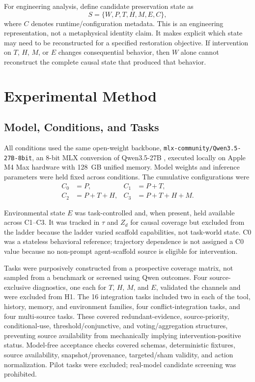 \documentclass[conference]{IEEEtran}
\begin{document}
For engineering analysis, define candidate preservation state as
\begin{equation}
S=\{W,P,T,H,M,E,C\},
\label{eq:state}
\end{equation}
where $C$ denotes runtime/configuration metadata. This is an engineering representation, not a metaphysical identity claim. It makes explicit which state may need to be reconstructed for a specified restoration objective. If intervention on $T$, $H$, $M$, or $E$ changes consequential behavior, then $W$ alone cannot reconstruct the complete causal state that produced that behavior.

\section{Experimental Method}
\subsection{Model, Conditions, and Tasks}
All conditions used the same open-weight backbone, \texttt{mlx-community/}\allowbreak\texttt{Qwen3.5-27B-8bit}, an 8-bit MLX conversion of Qwen3.5-27B \cite{b20}, executed locally on Apple M4 Max hardware with 128~GB unified memory. Model weights and inference parameters were held fixed across conditions. The cumulative configurations were
\begin{equation}
\begin{aligned}
C_0&=P, & C_1&=P+T,\\
C_2&=P+T+H, & C_3&=P+T+H+M.
\end{aligned}
\label{eq:conditions}
\end{equation}

Environmental state $E$ was task-controlled and, when present, held available across C1--C3. It was tracked in $\tau$ and $Z_d$ for causal coverage but excluded from the ladder because the ladder varied scaffold capabilities, not task-world state. C0 was a stateless behavioral reference; trajectory dependence is not assigned a C0 value because no non-prompt agent-scaffold source is eligible for intervention.

Tasks were purposively constructed from a prospective coverage matrix, not sampled from a benchmark or screened using Qwen outcomes. Four source-exclusive diagnostics, one each for $T$, $H$, $M$, and $E$, validated the channels and were excluded from H1. The 16 integration tasks included two in each of the tool, history, memory, and environment families, four conflict-integration tasks, and four multi-source tasks. These covered redundant-evidence, source-priority, conditional-use, threshold/conjunctive, and voting/aggregation structures, preventing source availability from mechanically implying intervention-positive status. Model-free acceptance checks covered schemas, deterministic fixtures, source availability, snapshot/provenance, targeted/sham validity, and action normalization. Pilot tasks were excluded; real-model candidate screening was prohibited.
\end{document}
